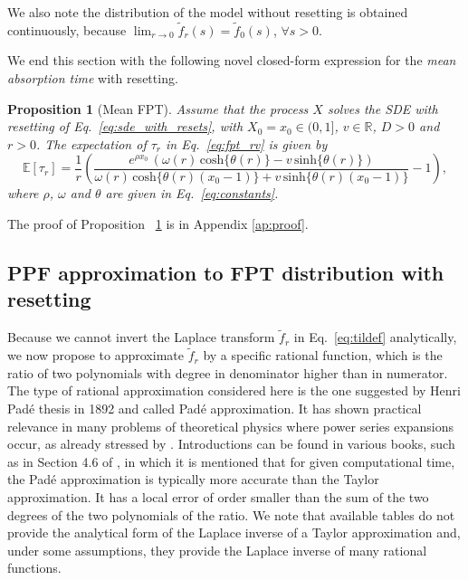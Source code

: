 \documentclass[preprint,12pt]{elsarticle}
\numberwithin{equation}{section}
\theoremstyle{plain} \newtheorem{theorem}{Theorem}[section]
\theoremstyle{plain} \newtheorem{proposition}[theorem]{Proposition}
\theoremstyle{plain} \newtheorem{lemma}[theorem]{Lemma}
\theoremstyle{plain} \newtheorem{corollary}[theorem]{Corollary}
\theoremstyle{definition} \newtheorem{definition}[theorem]{Definition}
\theoremstyle{definition} \newtheorem{notation}[theorem]{Notation}
\theoremstyle{remark} \newtheorem{remark}[theorem]{Remark}
\theoremstyle{remark} \newtheorem{remarks}[theorem]{Remarks}
\theoremstyle{remark} \newtheorem{algorithm2}[theorem]{Algorithm}
\theoremstyle{remark} \newtheorem{example}[theorem]{Example}
\begin{document}
We also note the distribution of the model without resetting
is obtained continuously, because
$\lim_{r \to 0} \tilde{f}_r(s) = \tilde{f}_0(s)$,
$\forall s>0$.

We end this section with the following novel closed-form expression for the
\emph{mean absorption time} with resetting.
\begin{proposition}[Mean FPT]       \label{p22}
Assume that the process $X$ solves the SDE with resetting of Eq.~\eqref{eq:sde_with_resets}, with $X_0 = x_0 \in (0, 1]$, 
$v \in \mathbb R$, $D>0$ and $r>0$. The expectation of $\tau_r$ in Eq.~\eqref{eq:fpt_rv} is given by
\begin{equation}
	\mathbb{E} [\tau_r]
	=\frac{1}{r}\left(\frac{e^{\rho x_0} \, (\omega(r) \, \mathrm{cosh}\{\theta(r)\}-v \, \mathrm{sinh}\{\theta(r)\})}{\omega(r) \, \mathrm{cosh}\{\theta(r)(x_0-1)\}+v \, \mathrm{sinh}\{\theta(r)(x_0-1)\}}-1\right),
\end{equation} 
where $\rho$, $\omega$ and $\theta$ are given in Eq.~\eqref{eq:constants}. 
\label{prop:mfpt}
\end{proposition}
The proof of Proposition ~\ref{p22} is in Appendix \ref{ap:proof}.

\subsection{PPF approximation to FPT distribution with resetting} \label{subsec:3-2}
Because we cannot invert the Laplace transform 
$\tilde{f}_r$ in
Eq.~\eqref{eq:tildef} analytically, we now
propose to approximate $\tilde{f}_r$ by 
a specific rational function, which is
the ratio of two polynomials with degree in denominator
higher than in numerator. The type of rational approximation
considered here is the one suggested by 
Henri Pad\'e thesis in 1892 and called
Pad\'e approximation. It 
has shown practical relevance in many problems of
theoretical physics where power series expansions occur,
as already stressed by \cite{baker1961pade}. 
Introductions can be found in various books, such as in 
Section 4.6 of \cite{mathews2004numerical}, in which it is mentioned
that for given computational time, the Pad\'e approximation
is typically more accurate than the Taylor approximation.
It has a local error of order smaller than the sum of the two
degrees of the two polynomials of the ratio. We note that available tables do not provide the analytical form of the Laplace inverse of a Taylor approximation and, under some assumptions, they provide the Laplace inverse of many rational functions. 
\end{document}
